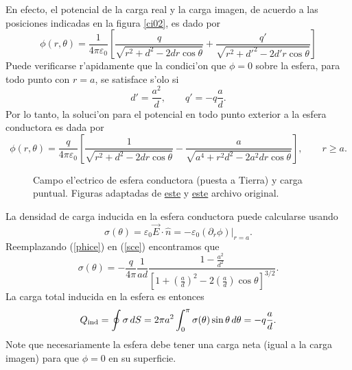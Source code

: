 En efecto, el potencial de la carga real y la carga imagen, de acuerdo a las posiciones indicadas en la figura \ref{ci02}, es dado por
\begin{equation}
 \phi(r,\theta)=\frac{1}{4\pi\varepsilon_0}\left[\frac{q}{\sqrt{
r^2+d^2-2dr\cos\theta } } +\frac{q'}{\sqrt{r^2+d'^2-2d'r\cos\theta}}\right]
\end{equation}
Puede verificarse r'apidamente que la condici'on que $\phi=0$ sobre la esfera, para todo punto con $r=a$, se satisface s'olo si
\begin{equation}
 d'=\frac{a^2}{d}, \qquad q'=-q\frac{a}{d}.
\end{equation}
Por lo tanto, la soluci'on para el potencial en todo punto exterior a la
esfera conductora es dada por
\begin{equation}\label{phice}
 \phi(r,\theta)=\frac{q}{4\pi\varepsilon_0}\left[\frac{1}{\sqrt{
r^2+d^2-2dr\cos\theta}}
-\frac{a}{\sqrt{a^4+r^2d^2-2a^2dr\cos\theta}}\right], \qquad r\ge a .
\end{equation}
\begin{center}
\begin{figure}[H]
\centerline{
\hspace{2cm}}
\caption{Campo el'ectrico de esfera conductora (puesta a Tierra) y carga puntual. 
Figuras adaptadas de  \href{http://commons.wikimedia.org/wiki/File:VFPt_metal_ball_grounded.svg}{este} y \href{http://commons.wikimedia.org/wiki/File:VFPt_metal_ball_grounded_transparent.svg}{este} archivo original.}
\label{fig:eyc}
\end{figure}
\end{center}
La densidad de carga inducida en la esfera conductora puede calcularse usando
\begin{equation}\label{sce}
 \sigma(\theta)=\varepsilon_0\vec{E}\cdot\hat{n}
=-\varepsilon_0\left.(\partial_r\phi)\right|_{r=a}.
\end{equation}
Reemplazando (\ref{phice}) en (\ref{sce}) encontramos que
\begin{equation}
 \sigma(\theta)=-\frac{q}{4\pi}\frac{1}{ad}\frac{1-\frac{a^2}{d^2
}}{\left[1+\left(\frac{a}{d}\right)^2-2\left(\frac{a}{d}\right)\cos\theta\right]
^{3/2}}.
\end{equation}
La carga total inducida en la esfera es entonces
\begin{equation}
 Q_{\rm ind}=\oint\sigma\,dS=2\pi
a^2\int_0^\pi\sigma(\theta)\sin\theta\,d\theta=-q\frac{a}{d}.
\end{equation}
Note que necesariamente la esfera debe tener una carga neta (igual a la carga imagen) para que $\phi=0$ en su superficie.


